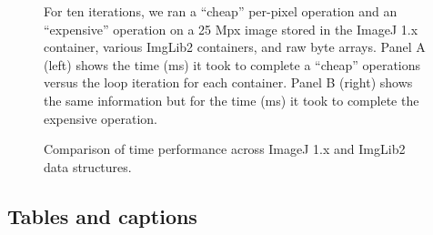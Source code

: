 \documentclass{bmcart}
\begin{document}
\begin{backmatter}
  \begin{figure}[h!]
    \caption{Comparison of time performance across ImageJ 1.x and ImgLib2 data
    structures.}
    \begin{flushleft}
      For ten iterations, we ran a ``cheap'' per-pixel operation and an
      ``expensive'' operation on a 25 Mpx image stored in the ImageJ 1.x
      container, various ImgLib2 containers, and raw byte arrays. Panel A
      (left) shows the time (ms) it took to complete a ``cheap'' operations
      versus the loop iteration for each container. Panel B (right) shows the
      same information but for the time (ms) it took to complete the expensive
      operation.
    \end{flushleft}
  \end{figure}

\subsection*{Tables and captions}
  \renewcommand\thetable{S.\arabic{table}}
  \setcounter{table}{0}


\end{backmatter}
\end{document}
